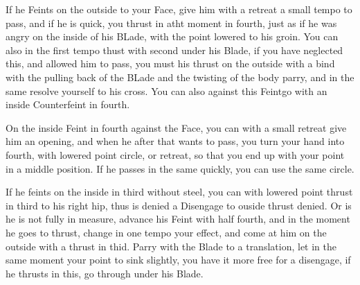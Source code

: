 If he Feints on the outside to your Face, give him with a retreat a
small tempo to pass, and if he is quick, you thrust in atht moment in
fourth, just as if he was angry on the inside of his BLade, with the
point lowered to his groin. You can also in the first tempo thust with
second under his Blade, if you have neglected this, and allowed him to
pass, you must his thrust on the outside with a bind with the pulling
back of the BLade and the twisting of the body parry, and in the same
resolve yourself to his cross. You can also against this Feintgo  with an
inside Counterfeint in fourth.


On the inside Feint in fourth against the Face, you can with a small
retreat give him an opening, and when he after that wants to pass, you
turn your hand into fourth, with lowered point circle, or retreat, so
that you end up with your point in a middle position. If he passes in
the same quickly, you can use the same circle.


If he feints on the inside in third without steel, you can with
lowered point thrust in third to his right hip, thus is denied a
Disengage to ouside thrust denied. Or is he is not fully in measure,
advance his Feint with half fourth, and in the moment he goes to
thrust, change in one tempo your effect, and come at him on the
outside with a thrust in thid. Parry with the Blade to a translation,
let in the same moment your point to sink slightly, you have it more
free for a disengage, if he thrusts in this, go through under his Blade.